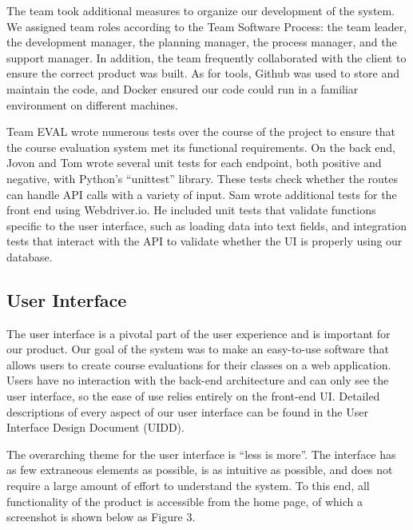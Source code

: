 \documentclass{article}
\begin{document}
The team took additional measures to organize our development of the system. We assigned team roles according to the Team Software Process: the team leader, the development manager, the planning manager, the process manager, and the support manager. In addition, the team frequently collaborated with the client to ensure the correct product was built. As for tools, Github was used to store and maintain the code, and Docker ensured our code could run in a familiar environment on different machines.

Team EVAL wrote numerous tests over the course of the project to ensure that the course evaluation system met its functional requirements. On the back end, Jovon and Tom wrote several unit tests for each endpoint, both positive and negative, with Python's ``unittest'' library. These tests check whether the routes can handle API calls with a variety of input. Sam wrote additional tests for the front end using Webdriver.io. He included unit tests that validate functions specific to the user interface, such as loading data into text fields, and integration tests that interact with the API to validate whether the UI is properly using our database.

\subsection{User Interface}

The user interface is a pivotal part of the user experience and is important for our product. Our goal of the system was to make an easy-to-use software that allows users to create course evaluations for their classes on a web application. Users have no interaction with the back-end architecture and can only see the user interface, so the ease of use relies entirely on the front-end UI. Detailed descriptions of every aspect of our user interface can be found in the User Interface Design Document (UIDD). 

The overarching theme for the user interface is ``less is more''.  The interface has as few extraneous elements as possible, is as intuitive as possible, and does not require a large amount of effort to understand the system. To this end, all functionality of the product is accessible from the home page, of which a screenshot is shown below as Figure 3.
\end{document}
